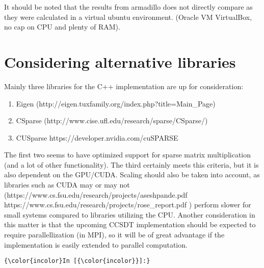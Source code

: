 \documentclass{article}
\begin{document}
It should be noted that the results from armadillo does not directly
compare as they were calculated in a virtual ubuntu environment. (Oracle
VM VirtualBox, no cap on CPU and plenty of RAM).

    \section{Considering alternative
libraries}\label{considering-alternative-libraries}

Mainly three libraries for the C++ implementation are up for
consideration:

\begin{enumerate}
\def\labelenumi{\arabic{enumi}.}
\itemsep1pt\parskip0pt
\item
  Eigen (http://eigen.tuxfamily.org/index.php?title=Main\_Page)
\item
  CSparse (http://www.cise.ufl.edu/research/sparse/CSparse/)
\item
  CUSparse https://developer.nvidia.com/cuSPARSE
\end{enumerate}

The first two seems to have optimized support for sparse matrix
multiplication (and a lot of other functionality). The third certainly
meets this criteria, but it is also dependent on the GPU/CUDA. Scaling
should also be taken into account, as libraries such as CUDA may or may
not (https://www.cs.fsu.edu/research/projects/aseshpande.pdf
https://www.cs.fsu.edu/research/projects/rose\_report.pdf ) perform
slower for small systems compared to libraries utilizing the CPU.
Another consideration in this matter is that the upcoming CCSDT
implementation should be expected to require parallellization (in MPI),
so it will be of great advantage if the implementation is easily
extended to parallel computation.

    \begin{Verbatim}[commandchars=\\\{\}]
{\color{incolor}In [{\color{incolor}}]:} 
\end{Verbatim}


    
    
    
    
\end{document}
